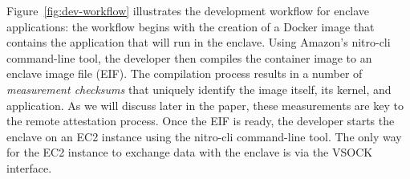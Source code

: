Figure~\ref{fig:dev-workflow} illustrates the development workflow for enclave
applications: the workflow begins with the creation of a Docker image that
contains the application that will run in the enclave.  Using Amazon's
nitro-cli command-line tool, the developer then compiles the container image to
an enclave image file (EIF).  The compilation process results in a number of
\emph{measurement checksums} that uniquely identify the image itself, its
kernel, and application.  As we will discuss later in the paper, these
measurements are key to the remote attestation process.
%
Once the EIF is ready, the developer starts the enclave on an EC2 instance
using the nitro-cli command-line tool.  The only way for the EC2 instance to
exchange data with the enclave is via the VSOCK interface.
